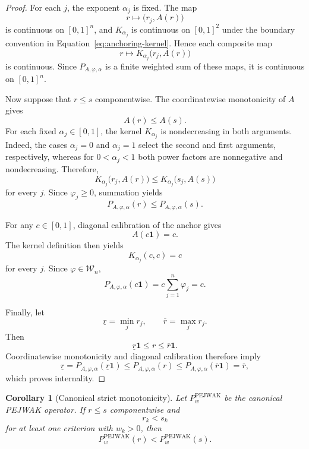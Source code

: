 \documentclass[reqno,11pt]{amsart}
\theoremstyle{definition}
\theoremstyle{plain}
\newtheorem{corollary}{Corollary}
\theoremstyle{remark}
\begin{document}
\begin{proof}
For each $j$, the exponent $\alpha_j$ is fixed. The map
\[
r\longmapsto \bigl(r_j,A(r)\bigr)
\]
is continuous on $[0,1]^n$, and $K_{\alpha_j}$ is continuous on
$[0,1]^2$ under the boundary convention in
Equation~\eqref{eq:anchoring-kernel}. Hence each composite map
\[
r\longmapsto K_{\alpha_j}\bigl(r_j,A(r)\bigr)
\]
is continuous. Since $P_{A,\varphi,\alpha}$ is a finite weighted sum of
these maps, it is continuous on $[0,1]^n$.

Now suppose that $r\leq s$ componentwise. The coordinatewise
monotonicity of $A$ gives
\[
A(r)\leq A(s).
\]
For each fixed $\alpha_j\in[0,1]$, the kernel $K_{\alpha_j}$ is
nondecreasing in both arguments. Indeed, the cases $\alpha_j=0$ and
$\alpha_j=1$ select the second and first arguments, respectively,
whereas for $0<\alpha_j<1$ both power factors are nonnegative and
nondecreasing. Therefore,
\[
K_{\alpha_j}\bigl(r_j,A(r)\bigr)
\leq
K_{\alpha_j}\bigl(s_j,A(s)\bigr)
\]
for every $j$. Since $\varphi_j\geq0$, summation yields
\[
P_{A,\varphi,\alpha}(r)
\leq
P_{A,\varphi,\alpha}(s).
\]

For any $c\in[0,1]$, diagonal calibration of the anchor gives
\[
A(c\mathbf 1)=c.
\]
The kernel definition then yields
\[
K_{\alpha_j}(c,c)=c
\]
for every $j$. Since $\varphi\in\mathcal W_n$,
\[
P_{A,\varphi,\alpha}(c\mathbf 1)
=
c\sum_{j=1}^{n}\varphi_j
=
c.
\]

Finally, let
\[
\underline r=\min_j r_j,
\qquad
\overline r=\max_j r_j.
\]
Then
\[
\underline r\mathbf 1
\leq
r
\leq
\overline r\mathbf 1.
\]
Coordinatewise monotonicity and diagonal calibration therefore imply
\[
\underline r
=
P_{A,\varphi,\alpha}(\underline r\mathbf 1)
\leq
P_{A,\varphi,\alpha}(r)
\leq
P_{A,\varphi,\alpha}(\overline r\mathbf 1)
=
\overline r,
\]
which proves internality.
\end{proof}

\begin{corollary}[Canonical strict monotonicity]
Let $P_w^{\mathrm{PEJWAK}}$ be the canonical PEJWAK operator. If
$r\leq s$ componentwise and
\[
r_k<s_k
\]
for at least one criterion with $w_k>0$, then
\[
P_w^{\mathrm{PEJWAK}}(r)
<
P_w^{\mathrm{PEJWAK}}(s).
\]
\end{corollary}
\end{document}
